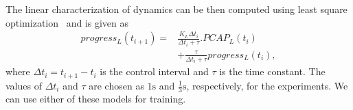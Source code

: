The linear characterization of dynamics can be then computed using least square optimization~\cite{cerf2021sustaining} and is given as
\begin{equation}
            \begin{aligned}
                progress_L (t_{i+1}) = & \frac{K_L \Delta t_i}{\Delta t_i+\tau}.PCAP_{L}(t_i) \\& +\frac{\tau}{\Delta t_i + \tau} progress_L(t_i),
            \end{aligned}
            \label{eq:linear_mathematical_model}
        \end{equation}
where
$\Delta t_i = t_{i+1} - t_i$ is the control interval and $\tau$ is the time constant. The values of $\Delta t_i$ and $\tau$ are chosen as $1 \unit{\second}$ and $\frac{1}{3}\unit{\second}$, respectively, for the experiments. We can use either of these models for training.

